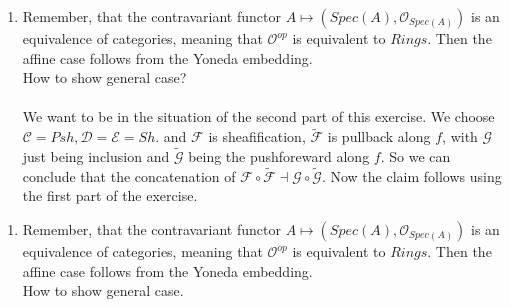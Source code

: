 \begin{exercise}{3}
    \begin{enumerate}
        \item Remember, that the 
        contravariant functor
         $A\mapsto (Spec(A),\mathcal{O}_{Spec(A)})$
         is an equivalence of categories, meaning that 
         $\mathcal{O}^{op}$ is equivalent to $Rings$. Then
         the affine case follows from the Yoneda embedding.\\
         How to show general case?
         \\
         \\
         We want to be in the situation of the second part of
         this exercise. We choose $\mathcal{C}=Psh, \mathcal{D}=\mathcal{E}=Sh$.
         and $\mathcal{F}$ is sheafification, $\mathcal{\tilde{F}}$ is pullback
         along $f$, with $\mathcal{G}$ just being inclusion and $\tilde{\mathcal{G}}$
         being the pushforeward
         along $f$. So we can conclude that the concatenation of 
         $\mathcal{F}\circ \mathcal{\tilde{F}}\dashv \mathcal{G}\circ
            \mathcal{\tilde{G}}$.
         Now the claim follows using the first part of the exercise.

    \end{enumerate}
\end{exercise}

\begin{exercise}{3}
    \begin{enumerate}
        \item Remember, that the 
        contravariant functor
         $A\mapsto (Spec(A),\mathcal{O}_{Spec(A)})$
         is an equivalence of categories, meaning that 
         $\mathcal{O}^{op}$ is equivalent to $Rings$. Then
         the affine case follows from the Yoneda embedding.\\
         How to show general case.
    \end{enumerate}
\end{exercise}

